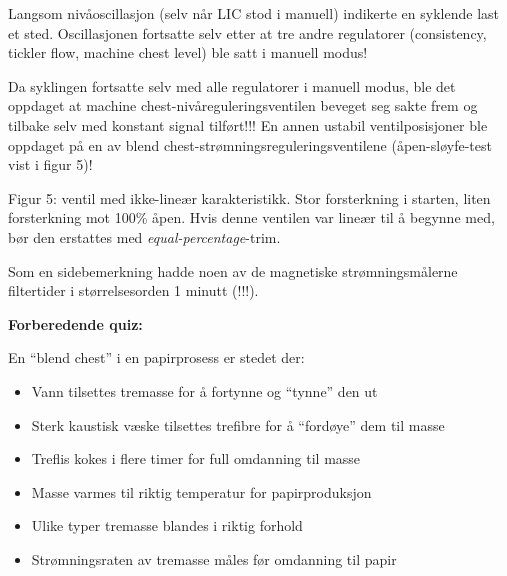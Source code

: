 \vskip 10pt

Langsom nivåoscillasjon (selv når LIC stod i manuell) indikerte en syklende last et sted. Oscillasjonen fortsatte selv etter at tre andre regulatorer (consistency, tickler flow, machine chest level) ble satt i manuell modus!

\vskip 10pt

Da syklingen fortsatte selv med alle regulatorer i manuell modus, ble det oppdaget at machine chest-nivåreguleringsventilen beveget seg sakte frem og tilbake selv med konstant signal tilført!!! En annen ustabil ventilposisjoner ble oppdaget på en av blend chest-strømningsreguleringsventilene (åpen-sløyfe-test vist i figur 5)!

\vskip 10pt

Figur 5: ventil med ikke-lineær karakteristikk. Stor forsterkning i starten, liten forsterkning mot 100\% åpen. Hvis denne ventilen var lineær til å begynne med, bør den erstattes med {\it equal-percentage}-trim.

\vskip 10pt

Som en sidebemerkning hadde noen av de magnetiske strømningsmålerne filtertider i størrelsesorden 1 minutt (!!!).






\vfil \eject

\noindent
{\bf Forberedende quiz:}

En ``blend chest'' i en papirprosess er stedet der:

\begin{itemize}
\item{} Vann tilsettes tremasse for å fortynne og ``tynne'' den ut
\vskip 5pt 
\item{} Sterk kaustisk væske tilsettes trefibre for å ``fordøye'' dem til masse
\vskip 5pt 
\item{} Treflis kokes i flere timer for full omdanning til masse
\vskip 5pt 
\item{} Masse varmes til riktig temperatur for papirproduksjon
\vskip 5pt 
\item{} Ulike typer tremasse blandes i riktig forhold
\vskip 5pt 
\item{} Strømningsraten av tremasse måles før omdanning til papir
\end{itemize}




